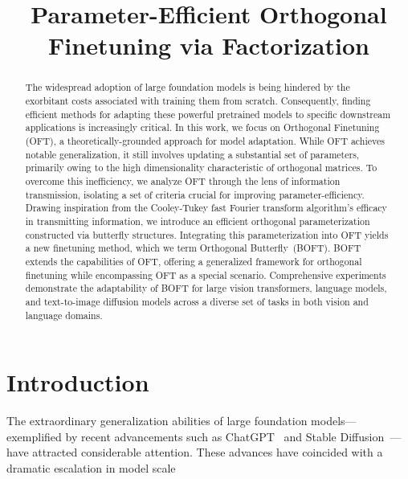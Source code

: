\title{Parameter-Efficient Orthogonal Finetuning via Factorization}

\begin{abstract}
The widespread adoption of large foundation models is being hindered by the exorbitant costs associated with training them from scratch. Consequently, finding efficient methods for adapting these powerful pretrained models to specific downstream applications is increasingly critical. In this work, we focus on Orthogonal Finetuning (OFT), a theoretically-grounded approach for model adaptation. While OFT achieves notable generalization, it still involves updating a substantial set of parameters, primarily owing to the high dimensionality characteristic of orthogonal matrices. To overcome this inefficiency, we analyze OFT through the lens of information transmission, isolating a set of criteria crucial for improving parameter-efficiency. Drawing inspiration from the Cooley-Tukey fast Fourier transform algorithm’s efficacy in transmitting information, we introduce an efficient orthogonal parameterization constructed via butterfly structures. Integrating this parameterization into OFT yields a new finetuning method, which we term Orthogonal Butterfly~(BOFT). BOFT extends the capabilities of OFT, offering a generalized framework for orthogonal finetuning while encompassing OFT as a special scenario. Comprehensive experiments demonstrate the adaptability of BOFT for large vision transformers, language models, and text-to-image diffusion models across a diverse set of tasks in both vision and language domains.
\end{abstract}

\section{Introduction}

The extraordinary generalization abilities of large foundation models—exemplified by recent advancements such as ChatGPT~\cite{brown2020language,chen2021evaluating} and Stable Diffusion~\cite{rombach2022high}—have attracted considerable attention. These advances have coincided with a dramatic escalation in model scale

